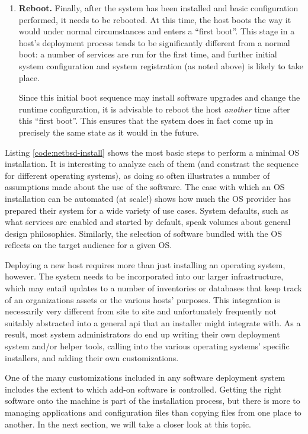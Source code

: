 \begin{enumerate}
	\item {\bf Reboot.}  Finally, after the system has been installed
		and basic configuration performed, it needs to be
		rebooted.  At this time, the host boots the way it would
		under normal circumstances and enters a ``first boot''.
		This stage in a host's deployment process tends to be
		significantly different from a normal boot:  a number of
		services are run for the first time, and further initial
		system configuration and system registration (as noted
		above) is likely to take place.

		Since this initial boot sequence may install software
		upgrades and change the runtime configuration, it is
		advisable to reboot the host {\em another} time
		after this ``first boot''.  This ensures that the system
		does in fact come up in precisely the same state as it
		would in the future.

\end{enumerate}

Listing \ref{code:netbsd-install} shows the most basic
steps to perform a minimal OS installation.  It is
interesting to analyze each of them (and constrast the
sequence for different operating systems), as doing so
often illustrates a number of assumptions made about
the use of the software.  The ease with which an OS
installation can be automated (at scale!) shows how
much the OS provider has prepared their system for a
wide variety of use cases.  System defaults, such as
what services are enabled and started by default,
speak volumes about general design philosophies.
Similarly, the selection of software bundled with the
OS reflects on the target audience for a given OS.

Deploying a new host requires more than just
installing an operating system, however.  The system
needs to be incorporated into our larger
infrastructure, which may entail updates to a number
of inventories or databases that keep track of an
organizations assets or the various hosts' purposes.
This integration is necessarily very different from
site to site and unfortunately frequently not suitably
abstracted into a general \gls{api} that an installer
might integrate with.  As a result, most system
administrators do end up writing their own deployment
system and/or helper tools, calling into the various
operating systems' specific installers, and adding
their own customizations.

One of the many customizations included in any
software deployment system includes the extent to
which add-on software is controlled.  Getting the
right software onto the machine is part of the
installation process, but there is more to managing
applications and configuration files than copying
files from one place to another.  In the next section,
we will take a closer look at this topic.

